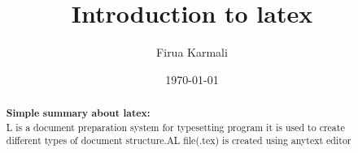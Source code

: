 \documentclass[a3paper,12pt]{article}
\title{Introduction to latex}
\author{Firua Karmali}
\date{\today}
\begin{document}
\begin{abstract}
\textbf{Simple summary about latex:}\\
L is a document preparation system for typesetting program it is used to create different types of document structure.AL file(.tex) is created using anytext editor
\end{abstract}
\end{document}
